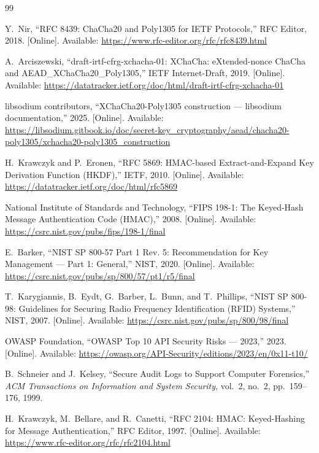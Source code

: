 \documentclass[journal,a4paper,onecolumn]{IEEEtran}
\begin{document}
\begin{thebibliography}{99}

Y.~Nir, ``RFC 8439: ChaCha20 and Poly1305 for IETF Protocols,'' RFC Editor, 2018. [Online]. Available: \url{https://www.rfc-editor.org/rfc/rfc8439.html}

A.~Arciszewski, ``draft-irtf-cfrg-xchacha-01: XChaCha: eXtended-nonce ChaCha and AEAD\_XChaCha20\_Poly1305,'' IETF Internet-Draft, 2019. [Online]. Available: \url{https://datatracker.ietf.org/doc/html/draft-irtf-cfrg-xchacha-01}

libsodium contributors, ``XChaCha20-Poly1305 construction --- libsodium documentation,'' 2025. [Online]. Available: \url{https://libsodium.gitbook.io/doc/secret-key_cryptography/aead/chacha20-poly1305/xchacha20-poly1305_construction}

H.~Krawczyk and P.~Eronen, ``RFC 5869: HMAC-based Extract-and-Expand Key Derivation Function (HKDF),'' IETF, 2010. [Online]. Available: \url{https://datatracker.ietf.org/doc/html/rfc5869}

National Institute of Standards and Technology, ``FIPS 198-1: The Keyed-Hash Message Authentication Code (HMAC),'' 2008. [Online]. Available: \url{https://csrc.nist.gov/pubs/fips/198-1/final}

E.~Barker, ``NIST SP 800-57 Part 1 Rev. 5: Recommendation for Key Management --- Part 1: General,'' NIST, 2020. [Online]. Available: \url{https://csrc.nist.gov/pubs/sp/800/57/pt1/r5/final}

T.~Karygiannis, B.~Eydt, G.~Barber, L.~Bunn, and T.~Phillips, ``NIST SP 800-98: Guidelines for Securing Radio Frequency Identification (RFID) Systems,'' NIST, 2007. [Online]. Available: \url{https://csrc.nist.gov/pubs/sp/800/98/final}

OWASP Foundation, ``OWASP Top 10 API Security Risks --- 2023,'' 2023. [Online]. Available: \url{https://owasp.org/API-Security/editions/2023/en/0x11-t10/}

B.~Schneier and J.~Kelsey, ``Secure Audit Logs to Support Computer Forensics,'' \emph{ACM Transactions on Information and System Security}, vol.~2, no.~2, pp.~159--176, 1999.

H.~Krawczyk, M.~Bellare, and R.~Canetti, ``RFC 2104: HMAC: Keyed-Hashing for Message Authentication,'' RFC Editor, 1997. [Online]. Available: \url{https://www.rfc-editor.org/rfc/rfc2104.html}


\end{thebibliography}
\end{document}
